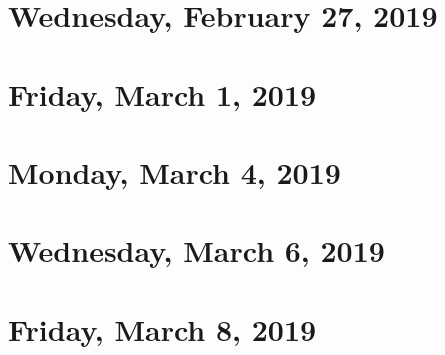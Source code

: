 \documentclass[reqno]{amsart}
\begin{document}
\section{Wednesday, February 27, 2019}
    

\section{Friday, March 1, 2019}
    

\section{Monday, March 4, 2019}
    

\section{Wednesday, March 6, 2019}
    

\section{Friday, March 8, 2019}
    
\end{document}
